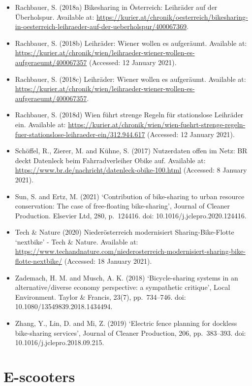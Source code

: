 \documentclass[
]{book}
\begin{document}
\begin{itemize}
\item
  Rachbauer, S. (2018a) Bikesharing in Österreich: Leihräder auf der Überholspur. Available at: \url{https://kurier.at/chronik/oesterreich/bikesharing-in-oesterreich-leihraeder-auf-der-ueberholspur/400067369}.
\item
  Rachbauer, S. (2018b) Leihräder: Wiener wollen es aufgeräumt. Available at: \url{https://kurier.at/chronik/wien/leihraeder-wiener-wollen-es-aufgeraeumt/400067357} (Accessed: 12 January 2021).
\item
  Rachbauer, S. (2018c) Leihräder: Wiener wollen es aufgeräumt. Available at: \url{https://kurier.at/chronik/wien/leihraeder-wiener-wollen-es-aufgeraeumt/400067357}.
\item
  Rachbauer, S. (2018d) Wien führt strenge Regeln für stationslose Leihräder ein. Available at: \url{https://kurier.at/chronik/wien/wien-fuehrt-strenge-regeln-fuer-stationslose-leihraeder-ein/312.944.617} (Accessed: 12 January 2021).
\item
  Schöffel, R., Zierer, M. and Kühne, S. (2017) Nutzerdaten offen im Netz: BR deckt Datenleck beim Fahrradverleiher Obike auf. Available at: \url{https://www.br.de/nachricht/datenleck-obike-100.html} (Accessed: 8 January 2021).
\item
  Sun, S. and Ertz, M. (2021) `Contribution of bike-sharing to urban resource conservation: The case of free-floating bike-sharing', Journal of Cleaner Production. Elsevier Ltd, 280, p.~124416. doi: 10.1016/j.jclepro.2020.124416.
\item
  Tech \& Nature (2020) Niederösterreich modernisiert Sharing-Bike-Flotte `nextbike' - Tech \& Nature. Available at: \url{https://www.techandnature.com/niederosterreich-modernisiert-sharing-bike-flotte-nextbike/} (Accessed: 18 January 2021).
\item
  Zademach, H. M. and Musch, A. K. (2018) `Bicycle-sharing systems in an alternative/diverse economy perspective: a sympathetic critique', Local Environment. Taylor \& Francis, 23(7), pp.~734--746. doi: 10.1080/13549839.2018.1434494.
\item
  Zhang, Y., Lin, D. and Mi, Z. (2019) `Electric fence planning for dockless bike-sharing services', Journal of Cleaner Production, 206, pp.~383--393. doi: 10.1016/j.jclepro.2018.09.215.
\end{itemize}

\hypertarget{scooters}{%
\section{E-scooters}\label{scooters}}
\end{document}
